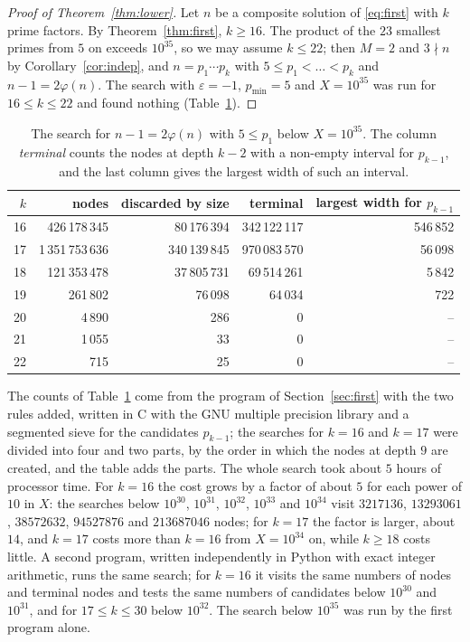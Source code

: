 \documentclass[11pt,reqno]{amsart}
\numberwithin{equation}{section}
\theoremstyle{plain}
\theoremstyle{definition}
\theoremstyle{remark}
\begin{document}
\begin{proof}[Proof of Theorem~\textup{\ref{thm:lower}}]
Let $n$ be a composite solution of \eqref{eq:first} with $k$ prime
factors. By Theorem~\ref{thm:first}, $k\ge16$. The product of the
$23$ smallest primes from $5$ on exceeds $10^{35}$, so we may assume
$k\le22$; then $M=2$ and $3\nmid n$ by Corollary~\ref{cor:indep},
and $n=p_1\cdots p_k$ with $5\le p_1<\dots<p_k$ and $n-1=2\varphi(n)$.
The search with $\varepsilon=-1$, $p_{\min}=5$ and $X=10^{35}$ was run
for $16\le k\le22$ and found nothing (Table~\ref{tab:below}).
\end{proof}

\begin{table}[ht]
\centering
\caption{The search for $n-1=2\varphi(n)$ with $5\le p_1$ below
$X=10^{35}$. The column \emph{terminal} counts the nodes at depth
$k-2$ with a non-empty interval for $p_{k-1}$, and the last column
gives the largest width of such an interval.}
\label{tab:below}
\smallskip
\begin{tabular}{@{}rrrrr@{}}
\toprule
$k$ & nodes & discarded by size & terminal & largest width for $p_{k-1}$ \\
\midrule
16 & 426\,178\,345 & 80\,176\,394 & 342\,122\,117 & 546\,852 \\
17 & 1\,351\,753\,636 & 340\,139\,845 & 970\,083\,570 & 56\,098 \\
18 & 121\,353\,478 & 37\,805\,731 & 69\,514\,261 & 5\,842 \\
19 & 261\,802 & 76\,098 & 64\,034 & 722 \\
20 & 4\,890 & 286 & 0 & -- \\
21 & 1\,055 & 33 & 0 & -- \\
22 & 715 & 25 & 0 & -- \\
\bottomrule
\end{tabular}
\end{table}

The counts of Table~\ref{tab:below} come from the program of
Section~\ref{sec:first} with the two rules added, written in C with
the GNU multiple precision library and a segmented sieve for the
candidates $p_{k-1}$; the searches for $k=16$ and $k=17$ were divided
into four and two parts, by the order in which the nodes at depth $9$
are created, and the table adds the parts. The whole search took
about $5$ hours of processor time. For $k=16$ the cost grows by a factor
of about $5$ for each power of $10$ in $X$: the searches below
$10^{30}$, $10^{31}$, $10^{32}$, $10^{33}$ and $10^{34}$ visit
$3217136$, $13293061$, $38572632$, $94527876$ and $213687046$ nodes;
for $k=17$ the factor is larger, about $14$, and $k=17$ costs more than
$k=16$ from $X=10^{34}$ on, while $k\ge18$ costs little. A second
program, written independently in Python with exact integer
arithmetic, runs the same search; for $k=16$ it visits the same
numbers of nodes and terminal nodes and tests the same numbers of
candidates below $10^{30}$ and $10^{31}$, and for $17\le k\le30$ below
$10^{32}$. The search below $10^{35}$ was run by the first program
alone.
\end{document}
